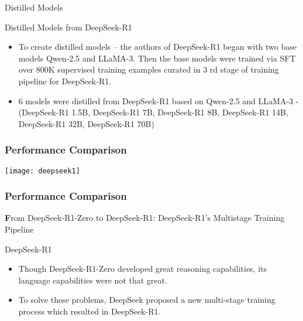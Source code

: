 \begin{frame}[fragile]{ Distilled Models}

Distilled Models from DeepSeek-R1

    \begin{itemize}
        \item   To create distilled models – the authors of DeepSeek-R1 began with two 
base models Qwen-2.5  and LLaMA-3. Then the base models were trained 
via SFT over 800K supervised training examples curated in 3 rd  stage of 
training pipeline for DeepSeek-R1. 
        \item  6 models were distilled from DeepSeek-R1 based on Qwen-2.5 and 
LLaMA-3 - (DeepSeek-R1 1.5B, DeepSeek-R1 7B, DeepSeek-R1 8B, 
DeepSeek-R1 14B, DeepSeek-R1 32B, DeepSeek-R1 70B)
    \end{itemize}
\end{frame}


\begin{frame}[fragile]\frametitle{ Performance Comparison}
		\begin{center}
		\texttt{[image: deepseek1]}
		\end{center}

\end{frame}

\begin{frame}[fragile]\frametitle{ Performance Comparison}
		\begin{center}
		{\textbf From DeepSeek-R1-Zero to DeepSeek-R1: DeepSeek-R1's Multistage Training Pipeline}
		\end{center}

\end{frame}

\begin{frame}[fragile]{DeepSeek-R1}


    \begin{itemize}
        \item  Though DeepSeek-R1-Zero developed great reasoning capabilities, its 
language capabilities were not that great.
        \item  To solve these problems,  DeepSeek proposed a new multi-stage  
training process which resulted in DeepSeek-R1.
    \end{itemize}
\end{frame}



